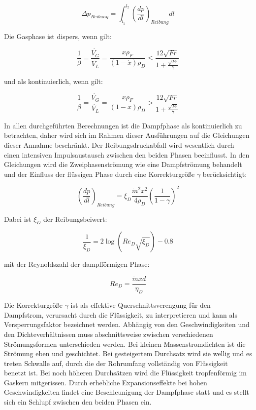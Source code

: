 \begin{equation}
\Delta p_{Reibung} = \int_{l_1}^{l_2} \left( \frac{dp}{dl} \right)_{Reibung} dl
\end{equation}


Die Gasphase ist dispers, wenn gilt:

\begin{equation}
\frac{1}{\beta} = \frac{\dot{V_G}}{\dot{V_L}} = \frac{x\rho_F}{(1-\dot{x})\rho_D} \leq \frac{12\sqrt{Fr}}{1+\frac{\sqrt{Fr}}{7}}
\end{equation}

und als kontinuierlich, wenn gilt:

\begin{equation}
\frac{1}{\beta} = \frac{\dot{V_G}}{\dot{V_L}} = \frac{x\rho_F}{(1-\dot{x})\rho_D} > \frac{12\sqrt{Fr}}{1+\frac{\sqrt{Fr}}{7}}
\end{equation}

In allen durchgeführten Berechnungen ist die Dampfphase als kontinuierlich zu betrachten, daher wird sich im Rahmen dieser Ausführungen auf die Gleichungen dieser Annahme beschränkt. Der Reibungsdruckabfall wird wesentlich durch einen intensiven Impulsaustausch zwischen den beiden Phasen beeinflusst. In den Gleichungen wird die Zweiphasenströmung wie eine Dampfströmung behandelt und der Einfluss der flüssigen Phase durch eine Korrekturgröße $\gamma$ berücksichtigt:

\begin{equation}
\left( \frac{dp}{dl} \right)_{Reibung} = \xi_D \frac{\dot{m}^2 x^2}{4\rho_D} \left(\frac{1}{1-\gamma} \right)^2
\end{equation}

Dabei ist $\xi_D$ der Reibungsbeiwert:

\begin{equation}
\frac{1}{\xi_D} = 2\log(Re_D \sqrt{\xi_D})-0.8
\end{equation}

mit der Reynoldszahl der dampfförmigen Phase:

\begin{equation}
Re_D = \frac{\dot{m} x d}{\eta_D}
\end{equation}

Die Korrekturgröße $\gamma$ ist als effektive Querschnittsverengung für den Dampfstrom, verursacht durch die Flüssigkeit, zu interpretieren und kann als Versperrungsfaktor bezeichnet werden. Abhängig von den Geschwindigkeiten und den Dichteverhältnissen muss abschnittsweise zwischen verschiedenen Strömungsformen unterschieden werden. Bei kleinen Massenstromdichten ist die Strömung eben und geschichtet. Bei gesteigertem Durchsatz wird sie wellig und es treten Schwalle auf, durch die der Rohrumfang vollständig von Flüssigkeit benetzt ist. Bei noch höheren Durchsätzen wird die Flüssigkeit tropfenförmig im Gaskern mitgerissen. Durch erhebliche Expansionseffekte bei hohen Geschwindigkeiten findet eine Beschleunigung der Dampfphase statt und es stellt sich ein Schlupf zwischen den beiden Phasen ein\cite{Kesper.1976}.

